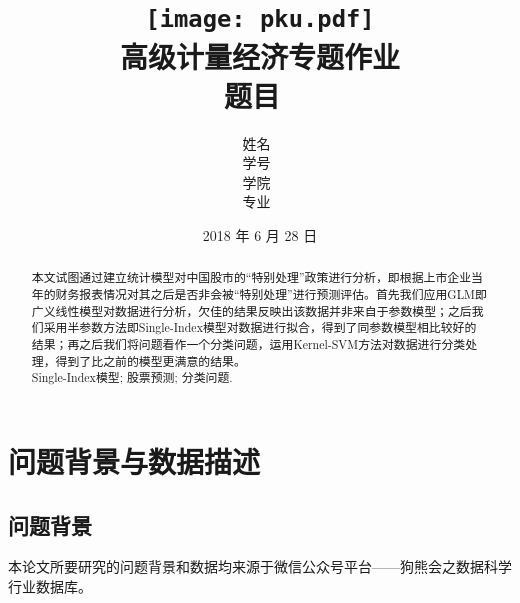 \documentclass[a4paper,UTF8]{article}
\begin{document}
\title{
	\texttt{[image: pku.pdf]}\\
	\vspace{2em}
	\textbf{\huge{高级计量经济专题作业}}\\
	\vspace{1em}
	\large{题目\ \underline{}}
}

\author{姓名\ \underline{}\\
	学号\ \underline{}\\
	学院\ \underline{}\\
	专业\ \underline{}
}

\date{2018 年 6 月 28 日}


\maketitle
\thispagestyle{empty}

\newpage


\tableofcontents

\newpage
\section*{}
\begin{abstract}
	\quad 本文试图通过建立统计模型对中国股市的“特别处理”政策进行分析，即根据上市企业当年的财务报表情况对其之后是否非会被“特别处理”进行预测评估。首先我们应用GLM即广义线性模型对数据进行分析，欠佳的结果反映出该数据并非来自于参数模型；之后我们采用半参数方法即Single-Index模型对数据进行拟合，得到了同参数模型相比较好的结果；再之后我们将问题看作一个分类问题，运用Kernel-SVM方法对数据进行分类处理，得到了比之前的模型更满意的结果。 \\
	 Single-Index模型; 股票预测; 分类问题.
\end{abstract}\thispagestyle{empty}
\newpage{}
\section{问题背景与数据描述}
\subsection{问题背景}
本论文所要研究的问题背景和数据均来源于微信公众号平台——狗熊会之数据科学行业数据库。\\
\end{document}
